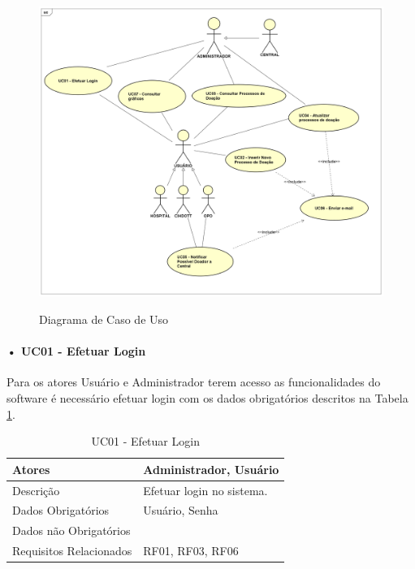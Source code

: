 \documentclass[portuguese,oneside]{tcc}
\begin{document}
\paragraph{}
\begin{figure}[htp]
\centering
\caption{Diagrama de Caso de Uso}
\includegraphics[width=17cm]{uc}
\label{fig:uc-diagram}
\end{figure}

\paragraph*{• UC01 - Efetuar Login}\label{tab:uc-login}
Para os atores Usuário e Administrador terem acesso as funcionalidades do software é necessário efetuar login com os dados obrigatórios descritos na Tabela \ref{table:uc01}.


\begin{table}
  \centering
  \caption{UC01 - Efetuar Login} \label{table:uc01}
\begin{tabular}{ |p{5cm}|p{5cm}|  }

\hline
Atores & 
Administrador, Usuário \\

\hline
Descrição & 
Efetuar login no sistema. \\

\hline
Dados Obrigatórios & Usuário, Senha
 \\

\hline
Dados não Obrigatórios & 
 \\

\hline
Requisitos Relacionados & RF01, RF03, RF06
 \\

\hline

\end{tabular}

\end{table}
\end{document}
